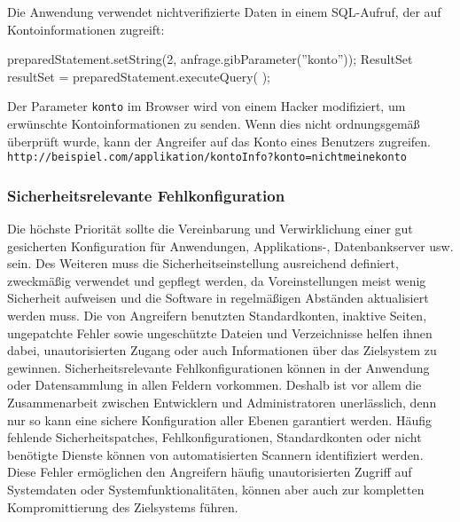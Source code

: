 Die Anwendung verwendet nichtverifizierte Daten in einem SQL-Aufruf, der auf Kontoinformationen zugreift\cite{owasp13top10}:

\begin{LaTeXCode}[caption={Broken Access Control - Beispiel 1},captionpos=b, label=LaTeXCode:bac1][numbers=none]
preparedStatement.setString(2, anfrage.gibParameter(''konto''));
ResultSet resultSet = preparedStatement.executeQuery( );
\end{LaTeXCode}

Der Parameter \texttt{konto} im Browser wird von einem Hacker modifiziert, um erwünschte Kontoinformationen zu senden. Wenn dies nicht ordnungsgemäß überprüft wurde, kann der Angreifer auf das Konto eines Benutzers zugreifen\cite[12]{owasp17top10}.\\

\texttt{http://beispiel.com/applikation/kontoInfo?konto=nichtmeinekonto}\\

\subsubsection{Sicherheitsrelevante Fehlkonfiguration}

Die höchste Priorität sollte die Vereinbarung und Verwirklichung einer gut gesicherten Konfiguration für Anwendungen, Applikations-, Datenbankserver usw. sein. Des Weiteren muss die Sicherheitseinstellung ausreichend definiert, zweckmäßig verwendet und gepflegt werden, da Voreinstellungen meist wenig Sicherheit aufweisen und die Software in regelmäßigen Abständen aktualisiert werden muss. Die von Angreifern benutzten Standardkonten, inaktive Seiten, ungepatchte Fehler sowie ungeschützte Dateien und Verzeichnisse helfen ihnen dabei, unautorisierten Zugang oder auch Informationen über das Zielsystem zu gewinnen. Sicherheitsrelevante Fehlkonfigurationen können in der Anwendung oder Datensammlung in allen Feldern vorkommen. Deshalb ist vor allem die Zusammenarbeit zwischen Entwicklern und Administratoren unerlässlich, denn nur so kann eine sichere Konfiguration aller Ebenen garantiert werden. Häufig fehlende Sicherheitspatches, Fehlkonfigurationen, Standardkonten oder nicht benötigte Dienste können von automatisierten Scannern identifiziert werden. Diese Fehler ermöglichen den Angreifern häufig unautorisierten Zugriff auf Systemdaten oder Systemfunktionalitäten, können aber auch zur kompletten Kompromittierung des Zielsystems führen\cite{owasp13top10}.\\

